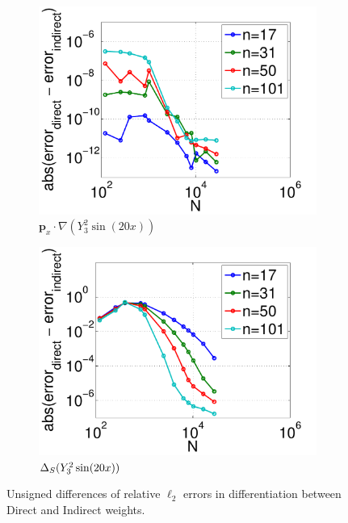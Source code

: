 \begin{figure}
	\centering
		\begin{subfigure}[t]{0.48\textwidth}
		\centering
	\includegraphics[width=1.0\textwidth]{../figures/appendices/direct_vs_indirect_weights/compare_weight_generation/xsfc_vs_xsfc_alt_on_sph32_times_sine_20x/abs_diff_of_rel_l2_errors-eps-converted-to.pdf}
	\caption{$\mathbf{p}_{x} \cdot \nabla ( Y_{3}^{2} \sin(20 x))$}
	\end{subfigure}
	\begin{subfigure}[t]{0.48\textwidth}
	\centering
	\includegraphics[width=1.0\textwidth]{../figures/appendices/direct_vs_indirect_weights/compare_weight_generation/lsfc_vs_px_grad_dot_px_grad/abs_diff_of_rel_l2_errors-eps-converted-to.pdf}
	\caption{$\Delta_S ( Y_{3}^{2} \sin(20 x) )$}
	\end{subfigure}
		\caption{Unsigned differences of relative $\ell_{2}$ errors in differentiation between Direct and Indirect weights.}
		\label{fig:direct_vs_indirect_unsigned_diff}
\end{figure}



%
%
%

